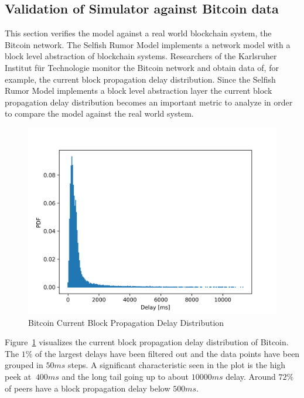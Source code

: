 \subsection{Validation of Simulator against Bitcoin data}
This section verifies the model against a real world blockchain system, the Bitcoin network. The Selfish Rumor Model implements a network model with a block level abstraction of blockchain systems. 
Researchers of the Karlsruher Institut für Technologie \cite{BitcoinNetworkMonitor} monitor the Bitcoin network and obtain data of, for example, the current block propagation delay distribution. Since the Selfish Rumor Model implements a block level abstraction layer the current block propagation delay distribution becomes an important metric to analyze in order to compare the model against the real world system.
\begin{figure}[h]
	\includegraphics[width=\textwidth]{figures/bitcoin_current_block_propagation_delay_distribution.png}
	\caption{Bitcoin Current Block Propagation Delay Distribution \cite{BitcoinNetworkMonitor}}
	\label{fig:blockdelaydis}
\end{figure}
Figure~\ref{fig:blockdelaydis} visualizes the current block propagation delay distribution of Bitcoin. The $1\% $ of the largest delays have been filtered out and the data points have been grouped in $50ms$ steps. A significant characteristic seen in the plot is the high peek at $~400ms$ and the long tail going up to about $10000ms$ delay. Around $72\% $ of peers have a block propagation delay below $500ms$.
